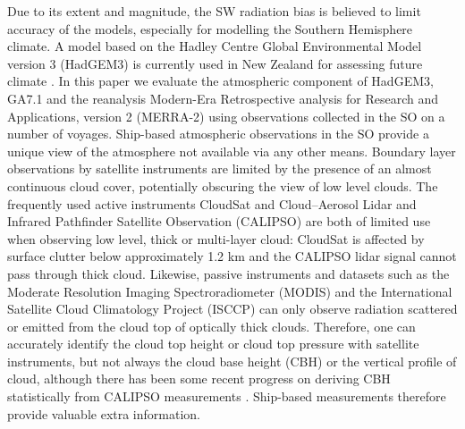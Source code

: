 Due to its extent and magnitude, the SW radiation bias is believed to limit 
accuracy of the models, especially for modelling the Southern Hemisphere
climate. A model based on the Hadley Centre Global Environmental Model version 3
(HadGEM3) is currently used in New Zealand for assessing future climate
\citep{williams2016}.
In this paper we evaluate the atmospheric component of HadGEM3, GA7.1
\citep{walters2017} and the reanalysis Modern-Era Retrospective analysis for
Research and Applications, version 2 (MERRA-2) using observations collected in
the SO on a number of voyages. Ship-based atmospheric observations in the SO
provide a unique view of the atmosphere not available via any other means.
Boundary layer observations by satellite instruments are limited by the presence
of an almost continuous cloud cover, potentially obscuring the view of low level
clouds. The frequently used active instruments CloudSat \citep{stephens2002} and
Cloud--Aerosol Lidar and Infrared Pathfinder Satellite Observation (CALIPSO)
\citep{winker2010} are both of limited use when observing low level, thick or
multi-layer cloud: CloudSat is affected by surface clutter below approximately
1.2 \unit{km} \citep{marchand2008} and the CALIPSO lidar signal cannot pass
through thick cloud. Likewise, passive instruments and datasets such as the
Moderate Resolution Imaging Spectroradiometer (MODIS) \citep{salomonson2002} and
the International Satellite Cloud Climatology Project (ISCCP) \citep{rossow1999}
can only observe radiation scattered or emitted from the cloud top of optically
thick clouds. Therefore, one can accurately identify the cloud top height or
cloud top pressure with satellite instruments, but not always the cloud base
height (CBH) or the vertical profile of cloud, although there has been some
recent progress on deriving CBH statistically from CALIPSO measurements
\citep{mulmenstadt2018}. Ship-based measurements therefore provide valuable
extra information.

